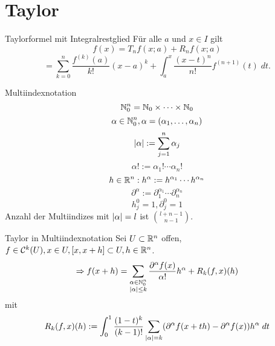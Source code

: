 \documentclass[main.tex]{subfiles}
\begin{document}
\section*{Taylor}

\begin{karte}{Taylorformel mit Integralrestglied}
    Für alle \( a \) und \( x\in I \)
    gilt 
    \[ f(x) = T_n f(x;a) + R_n f(x;a) \]
    \[ = \sum_{k=0}^n \frac{f^{(k)}(a)}{k!} (x-a)^k 
    + \int_a^x \frac{(x-t)^n}{n!} f^{(n+1)}(t) \; dt. \]
\end{karte}

\begin{karte}{Multiindexnotation}
    \[ \N_0^n = \N_0 \times \cdots \times \N_0 \]
    \[ \alpha \in \N_0^n, 
    \alpha = (\alpha_1, \ldots, \alpha_n) \]
    \[ \abs{\alpha} := \sum_{j=1}^n \alpha_j \]
    \[ \alpha! := \alpha_1! \cdots \alpha_n! \]
    \[ h\in \R^n: h^\alpha 
    := h^{\alpha_1}\cdots h^{\alpha_n} \]
    \[ \partial^\alpha := \partial_1^{\alpha_1} \cdots \partial_n^{\alpha_n} \]
    \[ h_j^0 = 1, \partial_j^0 = 1 \]
    Anzahl der Multiindizes mit \( \abs{\alpha} = l \) ist \( \binom{l+n-1}{n-1} \).
\end{karte}

\begin{karte}{Taylor in Multiindexnotation}
    Sei \( U \subset \R^n \) offen, \( f \in \mathcal{C}^k(U), 
    x \in U, [x,x+h] \subset U, h \in \R^n \).
    \[ \Rightarrow f(x + h) = \sum_{\substack{\alpha \in \N_0^n \\ \abs{\alpha} \leq k}} 
    \frac{ \partial^\alpha f(x) }{\alpha!} h^\alpha 
    + R_k(f, x)(h) \]
    mit 
    \[ R_k(f,x)(h) := \integralx{\frac{(1-t)^k}{(k-1)!} 
    \sum_{\abs{\alpha} = k} 
    (\partial^\alpha f(x+th)-\partial^\alpha f(x))h^\alpha}{0}{1}{t} \]
\end{karte}
\end{document}
